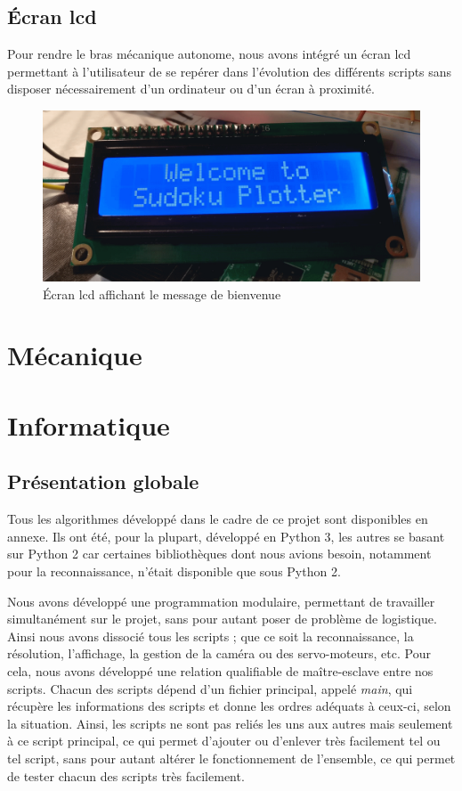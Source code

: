 \documentclass[12pt,a4paper]{report}
\begin{document}
\section{\'{E}cran lcd}
Pour rendre le bras mécanique autonome, nous avons intégré un écran lcd permettant à l'utilisateur de se repérer dans l'évolution des différents scripts sans disposer nécessairement d'un ordinateur ou d'un écran à proximité.
\begin{figure}[!h]
 \center
 \includegraphics[scale=0.3]{../pictures/ecran_lcd}
 \caption{\'{E}cran lcd affichant le message de bienvenue}
\end{figure}

	\chapter{Mécanique}
			
	
	\chapter{Informatique}
\section{Présentation globale}
	Tous les algorithmes développé dans le cadre de ce projet sont disponibles en annexe. Ils ont été, pour la plupart, développé en Python 3, les autres se basant sur Python 2 car certaines bibliothèques dont nous avions besoin, notamment pour la reconnaissance, n'était disponible que sous Python 2. 
	
	Nous avons développé une programmation modulaire, permettant de travailler simultanément sur le projet, sans pour autant poser de problème de logistique. Ainsi nous avons dissocié tous les scripts ; que ce soit la reconnaissance, la résolution, l'affichage, la gestion de la caméra ou des servo-moteurs, etc. Pour cela, nous avons développé une relation qualifiable de maître-esclave entre nos scripts. Chacun des scripts dépend d'un fichier principal, appelé \emph{main}, qui récupère les informations des scripts et donne les ordres adéquats à ceux-ci, selon la situation. Ainsi, les scripts ne sont pas reliés les uns aux autres mais seulement à ce script principal, ce qui permet d'ajouter ou d'enlever très facilement tel ou tel script, sans pour autant altérer le fonctionnement de l'ensemble, ce qui permet de tester chacun des scripts très facilement.
	
\end{document}
